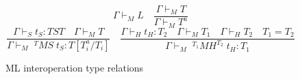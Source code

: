 \begin{figure}
\[
\Gamma\vdash_{M}L
\quad
\frac{\Gamma\vdash_{M}T}{\Gamma\vdash_{M}T^{a}}
\]
\[
\frac{\Gamma\vdash_{S}t_{S}:TST\quad\Gamma\vdash_{M}T}{\Gamma\vdash_{M}\;^{T}MS\;t_{S}:T[T^{a}_{i}/T_{i}]}
\quad
\frac{\Gamma\vdash_{H}t_{H}:T_{2}\quad\Gamma\vdash_{M}T_{1}\quad\Gamma\vdash_{H}T_{2}\quad T_{1}=T_{2}}{\Gamma\vdash_{M}\;^{T_{1}}MH^{T_{2}}\;t_{H}:T_{1}}
\]
\caption{ML interoperation type relations}
\label{mitr}
\end{figure}